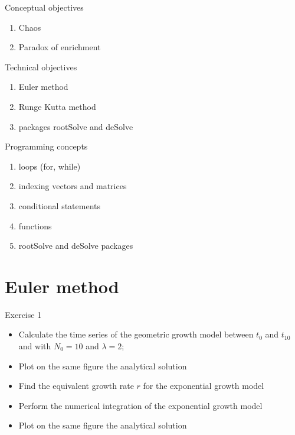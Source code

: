 \documentclass{eecslides}
\begin{document}
	\begin{frame}{Conceptual objectives}

	\begin{enumerate}
		\item Chaos
		\item Paradox of enrichment
	\end{enumerate}

	\end{frame}


	\begin{frame}{Technical objectives}

	\begin{enumerate}
		\item Euler method
		\item Runge Kutta method
		\item packages rootSolve and deSolve
	\end{enumerate}

	\end{frame}


	\begin{frame}{Programming concepts}

		\begin{enumerate}
			\item loops (for, while)
			\item indexing vectors and matrices
			\item conditional statements
			\item functions
			\item rootSolve and deSolve packages
		\end{enumerate}

	\end{frame}

	\section{Euler method}

	\begin{frame}{Exercise 1}
		\begin{itemize}
			\item Calculate the time series of the geometric growth model between $t_0$ and $t_10$ and with $N_0 = 10$ and $\lambda = 2$;	
			\item Plot on the same figure the analytical solution
			\item Find the equivalent growth rate $r$ for the exponential growth model
			\item Perform the numerical integration of the exponential growth model
			\item Plot on the same figure the analytical solution
		\end{itemize}
	\end{frame}
\end{document}
